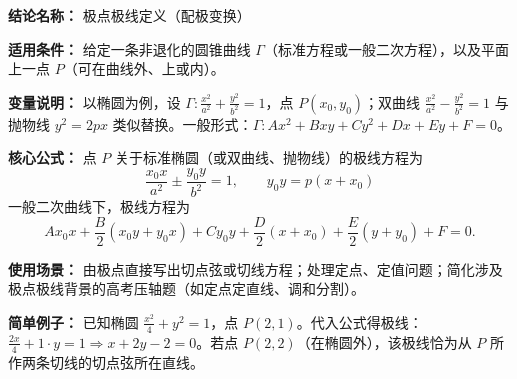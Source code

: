 \textbf{结论名称：} 极点极线定义（配极变换）

\textbf{适用条件：} 给定一条非退化的圆锥曲线 \(\Gamma\)（标准方程或一般二次方程），以及平面上一点 \(P\)（可在曲线外、上或内）。

\textbf{变量说明：} 以椭圆为例，设 \(\Gamma:\frac{x^2}{a^2}+\frac{y^2}{b^2}=1\)，点 \(P(x_0,y_0)\)；双曲线 \(\frac{x^2}{a^2}-\frac{y^2}{b^2}=1\) 与抛物线 \(y^2=2px\) 类似替换。一般形式：\(\Gamma:Ax^2+Bxy+Cy^2+Dx+Ey+F=0\)。

\textbf{核心公式：} 点 \(P\) 关于标准椭圆（或双曲线、抛物线）的极线方程为
\[
\boxed{\frac{x_0 x}{a^2} \pm \frac{y_0 y}{b^2} = 1},\qquad \boxed{y_0 y = p(x+x_0)}
\]
一般二次曲线下，极线方程为
\[
A x_0 x + \frac{B}{2}(x_0 y + y_0 x) + C y_0 y + \frac{D}{2}(x+x_0) + \frac{E}{2}(y+y_0) + F = 0 .
\]

\textbf{使用场景：} 由极点直接写出切点弦或切线方程；处理定点、定值问题；简化涉及极点极线背景的高考压轴题（如定点定直线、调和分割）。

\textbf{简单例子：} 已知椭圆 \(\frac{x^2}{4}+y^2=1\)，点 \(P(2,1)\)。代入公式得极线：\(\frac{2x}{4}+1\cdot y=1 \Rightarrow x+2y-2=0\)。若点 \(P(2,2)\)（在椭圆外），该极线恰为从 \(P\) 所作两条切线的切点弦所在直线。